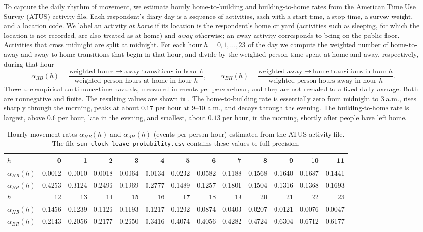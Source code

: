 \documentclass[11pt]{article}
\theoremstyle{definition}
\theoremstyle{plain}
\begin{document}
To capture the daily rhythm of movement, we estimate hourly home-to-building and building-to-home rates from the American Time Use Survey (ATUS) activity file. Each respondent's diary day is a sequence of activities, each with a start time, a stop time, a survey weight, and a location code. We label an activity \emph{at home} if its location is the respondent's home or yard (activities such as sleeping, for which the location is not recorded, are also treated as at home) and \emph{away} otherwise; an away activity corresponds to being on the public floor. Activities that cross midnight are split at midnight. For each hour $h=0,1,\ldots,23$ of the day we compute the weighted number of home-to-away and away-to-home transitions that begin in that hour, and divide by the weighted person-time spent at home and away, respectively, during that hour:
\begin{equation}\label{eq:atus-rates}
\alpha_{HB}(h)=\frac{\text{weighted home}\to\text{away transitions in hour }h}{\text{weighted person-hours at home in hour }h},
\qquad
\alpha_{BH}(h)=\frac{\text{weighted away}\to\text{home transitions in hour }h}{\text{weighted person-hours away in hour }h}.
\end{equation}
These are empirical continuous-time hazards, measured in events per person-hour, and they are not rescaled to a fixed daily average. Both are nonnegative and finite. The resulting values are shown in . The home-to-building rate is essentially zero from midnight to 3 a.m., rises sharply through the morning, peaks at about $0.17$ per hour at 9--10 a.m., and decays through the evening. The building-to-home rate is largest, above $0.6$ per hour, late in the evening, and smallest, about $0.13$ per hour, in the morning, shortly after people have left home.

\begin{table}[H]
\centering
\caption{Hourly movement rates $\alpha_{HB}(h)$ and $\alpha_{BH}(h)$ (events per person-hour) estimated from the ATUS activity file. The file \texttt{sun\_clock\_leave\_probability.csv} contains these values to full precision.}
\label{tab:sunrates}
\footnotesize
\setlength{\tabcolsep}{3.5pt}
\begin{tabular}{l*{12}{r}}
\toprule
$h$ & 0 & 1 & 2 & 3 & 4 & 5 & 6 & 7 & 8 & 9 & 10 & 11 \\
\midrule
$\alpha_{HB}(h)$ & 0.0012 & 0.0010 & 0.0018 & 0.0064 & 0.0134 & 0.0232 & 0.0582 & 0.1188 & 0.1568 & 0.1640 & 0.1687 & 0.1441 \\
$\alpha_{BH}(h)$ & 0.4253 & 0.3124 & 0.2496 & 0.1969 & 0.2777 & 0.1489 & 0.1257 & 0.1801 & 0.1504 & 0.1316 & 0.1368 & 0.1693 \\
\midrule\midrule
$h$ & 12 & 13 & 14 & 15 & 16 & 17 & 18 & 19 & 20 & 21 & 22 & 23 \\
\midrule
$\alpha_{HB}(h)$ & 0.1456 & 0.1239 & 0.1126 & 0.1193 & 0.1217 & 0.1202 & 0.0874 & 0.0403 & 0.0207 & 0.0121 & 0.0076 & 0.0047 \\
$\alpha_{BH}(h)$ & 0.2143 & 0.2056 & 0.2177 & 0.2650 & 0.3416 & 0.4074 & 0.4056 & 0.4282 & 0.4724 & 0.6304 & 0.6712 & 0.6177 \\
\bottomrule
\end{tabular}
\end{table}



\end{document}
